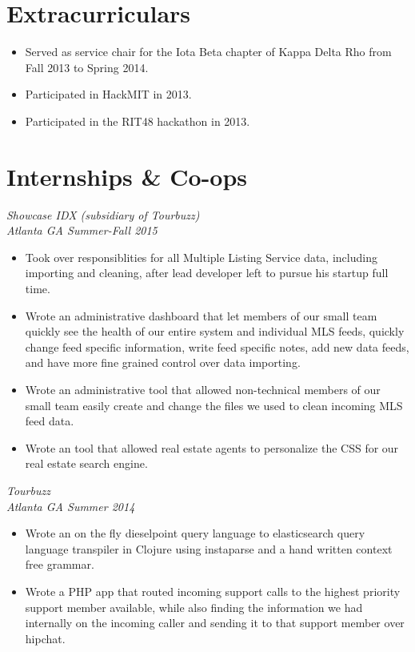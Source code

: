 \documentclass[line]{res}
\begin{document}
\begin{resume}
\begin{multicols}{2}
\section{Extracurriculars}
\begin{itemize}
    \item Served as service chair for the Iota Beta chapter of Kappa Delta Rho from Fall 2013 to Spring 2014.
    \item Participated in HackMIT in 2013.
    \item Participated in the RIT48 hackathon in 2013.
\end{itemize}

\columnbreak

\section{Internships \& Co-ops}
\textit{Showcase IDX (subsidiary of Tourbuzz)\\ Atlanta GA \hfill{Summer-Fall 2015}}
\begin{itemize}
    \item Took over responsiblities for all Multiple Listing Service data, including importing and cleaning, after lead developer
          left to pursue his startup full time.  
    \item Wrote an administrative dashboard that let members of our small team quickly see the health of
          our entire system and individual MLS feeds, quickly change feed specific information, 
          write feed specific notes, add new data feeds, and have more fine grained control over data importing.
    \item Wrote an administrative tool that allowed non-technical members of our small team easily create and change
          the files we used to clean incoming MLS feed data.
    \item Wrote an tool that allowed real estate agents to personalize the CSS for our real estate search engine.
\end{itemize}

\textit{Tourbuzz\\ Atlanta GA \hfill{Summer 2014}}
\begin{itemize}
    \item Wrote an on the fly dieselpoint query language to elasticsearch query language transpiler in Clojure 
          using instaparse and a hand written context free grammar.
    \item Wrote a PHP app that routed incoming support calls to the highest priority support member available,
          while also finding the information we had internally on the incoming caller and sending it to that 
          support member over hipchat.
\end{itemize}


\end{multicols}
\end{resume}
\end{document}
